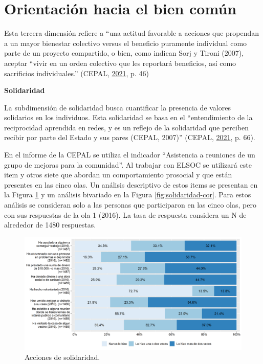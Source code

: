 \documentclass[
  12pt,
]{book}
\begin{document}
\hypertarget{orientaciuxf3n-hacia-el-bien-comuxfan}{%
\section{Orientación hacia el bien común}\label{orientaciuxf3n-hacia-el-bien-comuxfan}}

Esta tercera dimensión refiere a ``una actitud favorable a acciones que propendan a un mayor bienestar colectivo versus el beneficio puramente individual como parte de un proyecto compartido, o bien, como indican Sorj y Tironi (2007), aceptar ``vivir en un orden colectivo que les reportará beneficios, así como sacrificios individuales.'' (CEPAL, \protect\hyperlink{ref-cepal_cohesion_2021}{2021}, p. 46)

\textbf{Solidaridad}

La subdimensión de solidaridad busca cuantificar la presencia de valores solidarios en los individuos. Esta solidaridad se basa en el ``entendimiento de la reciprocidad aprendida en redes, y es un reflejo de la solidaridad que perciben recibir por parte del Estado y sus pares (CEPAL, 2007)'' (CEPAL, \protect\hyperlink{ref-cepal_cohesion_2021}{2021}, p. 66).

En el informe de la CEPAL se utiliza el indicador ``Asistencia a reuniones de un grupo de mejoras para la comunidad''. Al trabajar con ELSOC se utilizará este item y otros siete que abordan un comportamiento prosocial y que están presentes en las cinco olas. Un análisis descriptivo de estos items se presentan en la Figura \ref{fig:solidaridad} y un análisis bivariado en la Figura \ref{fig:solidaridad-cor}. Para estos análisis se consideran solo a las personas que participaron en las cinco olas, pero con sus respuestas de la ola 1 (2016). La tasa de respuesta considera un N de alrededor de 1480 respuestas.

\begin{figure}[H]

{\centering \includegraphics[width=1\linewidth,height=1\textheight]{output/graphs/solidaridad} 

}

\caption{Acciones de solidaridad.}\label{fig:solidaridad}
\end{figure}
\end{document}
